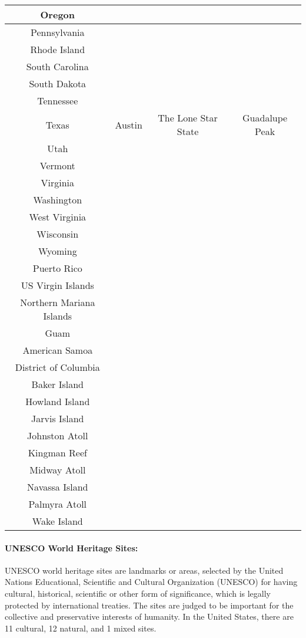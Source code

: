 		 \begin{tabular}{|c|c|c|c|}
				 \hline
				 Oregon 	& & &  \\
				 \hline
				 Pennsylvania 	& & &  \\
				 \hline
				 Rhode Island 	& & &  \\
				 \hline
				 South Carolina 	& & &  \\
				 \hline
				 South Dakota 	& & &  \\
				 \hline
				 Tennessee 	& & &  \\
				 \hline
				 Texas 	& Austin & The Lone Star State & Guadalupe Peak \\
				 \hline
				 Utah 	& & &  \\
				 \hline
				 Vermont 	& & &  \\
				 \hline
				 Virginia 	& & &  \\
				 \hline
				 Washington 	& & &  \\
				 \hline
				 West Virginia 	& & &  \\
				 \hline
				 Wisconsin 	& & &  \\
				 \hline
				 Wyoming 	& & &  \\
				 \hline
				 Puerto Rico	& & &  \\
				 \hline
				 US Virgin Islands	& & &  \\
				 \hline
				 Northern Mariana Islands	& & &  \\
				 \hline
				 Guam	& & &  \\
				 \hline
				 American Samoa	& & &  \\
				 \hline
				 District of Columbia	& & &  \\
				 \hline
				 Baker Island 	& & &  \\
				 \hline
				 Howland Island 	& & &  \\
				 \hline
				 Jarvis Island 	& & &  \\
				 \hline
				 Johnston Atoll 	& & &  \\
				 \hline
				 Kingman Reef 	& & &  \\
				 \hline
				 Midway Atoll 	& & &  \\
				 \hline
				 Navassa Island 	& & &  \\
				 \hline
				 Palmyra Atoll 	& & &  \\
				 \hline
				 Wake Island	& & &  \\
				 \hline
				 
				 
			\end{tabular}
		\newpage
		\paragraph{UNESCO World Heritage Sites:} UNESCO world heritage sites are landmarks or areas, selected by the United Nations Educational, Scientific and Cultural Organization (UNESCO) for having cultural, historical, scientific or other form of significance, which is legally protected by international treaties. The sites are judged to be important for the collective and preservative interests of humanity. In the United States, there are 11 cultural, 12 natural, and 1 mixed sites. 
		
